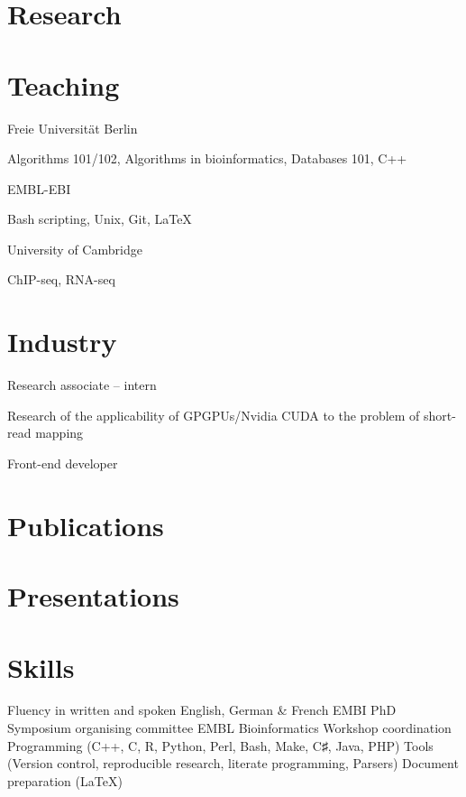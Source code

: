 \documentclass{klmr-cv}
\newcommand*\csharp{C♯}
\newcommand*\cpp{C++}
\begin{document}
\section{Research}

\section{Teaching}

\date{2008--2011}
\item{}
\item{Freie Universität Berlin}
\item{Algorithms 101/102, Algorithms in bioinformatics, Databases 101, \cpp}

\date{2011--2014}
\item{}
\item{EMBL-EBI}
\item{Bash scripting, Unix, Git, \LaTeX}

\date{2013--2015}
\item{}
\item{University of Cambridge}
\item{ChIP-seq, RNA-seq}

\section{Industry}

\date{Oct 2008--Feb 2009}
\item{}
\item{Research associate -- intern}
\item{Research of the applicability of GPGPUs/Nvidia CUDA to the problem of
        short-read mapping}

\date{Jan 2007--Jan 2008}
\item{}
\item{Front-end developer}

\section{Publications}

\section{Presentations}

\section{Skills}

\begin{itemize}
    \listitem Fluency in written and spoken English, German \& French
    \listitem EMBI PhD Symposium organising committee
    \listitem EMBL Bioinformatics Workshop coordination
    \listitem Programming (\cpp, C, R, Python, Perl, Bash, Make, \csharp, Java, PHP)
    \listitem Tools (Version control, reproducible research, literate
        programming, Parsers)
    \listitem Document preparation (\LaTeX)
\end{itemize}
\end{document}
